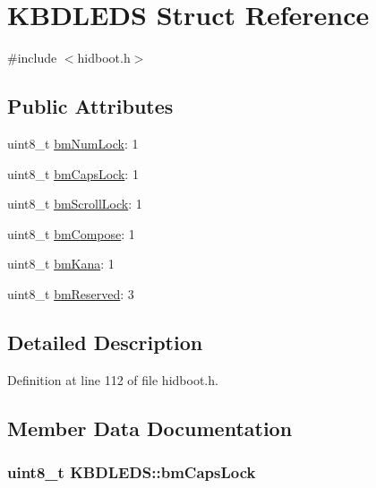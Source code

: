 \hypertarget{struct_k_b_d_l_e_d_s}{\section{\-K\-B\-D\-L\-E\-D\-S \-Struct \-Reference}
\label{struct_k_b_d_l_e_d_s}
}


{\ttfamily \#include $<$hidboot.\-h$>$}

\subsection*{\-Public \-Attributes}
\begin{DoxyCompactItemize}
\item 
uint8\-\_\-t \hyperlink{struct_k_b_d_l_e_d_s_a3885cc62f7ab3f3f450814d05204d1b3}{bm\-Num\-Lock}\-: 1
\item 
uint8\-\_\-t \hyperlink{struct_k_b_d_l_e_d_s_a8daacd8c1b35e99df01e7727ddd66fd0}{bm\-Caps\-Lock}\-: 1
\item 
uint8\-\_\-t \hyperlink{struct_k_b_d_l_e_d_s_adf2e5ff049894e40b0fab7d830f3c393}{bm\-Scroll\-Lock}\-: 1
\item 
uint8\-\_\-t \hyperlink{struct_k_b_d_l_e_d_s_a4a427e795e68a0f21a9f1fd919f301b7}{bm\-Compose}\-: 1
\item 
uint8\-\_\-t \hyperlink{struct_k_b_d_l_e_d_s_ab5ade03a9898e281a7bb639277460f53}{bm\-Kana}\-: 1
\item 
uint8\-\_\-t \hyperlink{struct_k_b_d_l_e_d_s_a92e26041dea84520a006a83a795c8071}{bm\-Reserved}\-: 3
\end{DoxyCompactItemize}


\subsection{\-Detailed \-Description}


\-Definition at line 112 of file hidboot.\-h.



\subsection{\-Member \-Data \-Documentation}
\hypertarget{struct_k_b_d_l_e_d_s_a8daacd8c1b35e99df01e7727ddd66fd0}{
\subsubsection[{bm\-Caps\-Lock}]{\setlength{\rightskip}{0pt plus 5cm}uint8\-\_\-t {\bf \-K\-B\-D\-L\-E\-D\-S\-::bm\-Caps\-Lock}}}\label{struct_k_b_d_l_e_d_s_a8daacd8c1b35e99df01e7727ddd66fd0}


